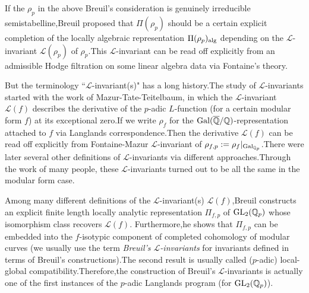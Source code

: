 \documentclass[SecEq,CM,GP]{degruyter-crelle} %
\theoremstyle{plain}
\newcommand{\alge}{{\rm alg}}
\newcommand{\gal}{{\rm Gal}}
\newcommand{\GLN}{{\rm GL}}
\newcommand{\BQ}{{\mathbb{Q}}}
\newcommand{\cL}{\mathcal L}
\newcommand{\sL}{\mathcal L}
\begin{document}
If the $\rho_p$ in the above Breuil's consideration is genuinely irreducible semistabelline,\;Breuil proposed that $\Pi(\rho_p)$ should be a certain explicit completion of the locally algebraic representation $\Pi(\rho_p)_{\alge}$ depending on the $\sL$-invariant $\cL(\rho_p)$ of $\rho_p$.\;This 
$\sL$-invariant can be read off explicitly from an admissible Hodge filtration on some linear algebra data via Fontaine's theory.\;



But the terminology ``$\sL$-invariant(s)" has a long history.\;The study of  $\sL$-invariants started with the work of Mazur-Tate-Teitelbaum, in which the  $\sL$-invariant $\cL(f)$ describes the derivative of the  $p$-adic  $L$-function (for a certain modular form $f$) at its exceptional zero.\;If we write $\rho_f$ for the $\gal(\overline{\BQ}/\BQ)$-representation attached to $f$ via Langlands correspondence.\;Then the derivative $\cL(f)$ can be read off explicitly from Fontaine-Mazur $\sL$-invariant of $\rho_{f,p}:=\rho_f|_{\gal_{\BQ_p}}$.\;There were later several other definitions of $\sL$-invariants via different approaches.\;Through the work of many people, these  $\sL$-invariants turned out to be all the same in the modular form case.\;

Among many different definitions of the $\sL$-invariant(s) $\cL(f)$,\;Breuil constructs an explicit finite length locally analytic representation $\Pi_{f,p}$ of $\GLN_2({\BQ}_p)$ whose isomorphism class recovers $\cL(f)$. Furthermore,\;he shows that $\Pi_{f,p}$ can be embedded into the $f$-isotypic component of completed cohomology of modular curves (we usually use the term \textit{Breuil's $\sL$-invariants} for invariants defined in terms of Breuil's constructions).\;The second result is usually called ($p$-adic) local-global compatibility.\;Therefore,\;the construction of Breuil's $\sL$-invariants is actually one of the first instances of the $p$-adic Langlands program (for $\GLN_2(\BQ_p)$).\;
\end{document}
